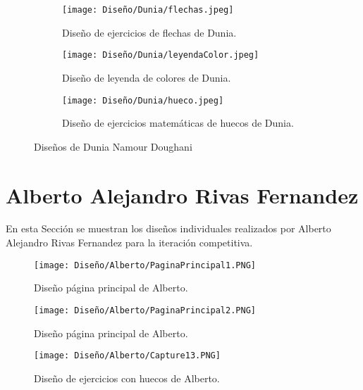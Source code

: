 \begin{figure}[ht!]
  \ContinuedFloat
  \begin{subfigure}{\textwidth}
    \centering
    \texttt{[image: Diseño/Dunia/flechas.jpeg]}
    \caption{Diseño de ejercicios de flechas de Dunia.}
    \label{dunia4}
  \end{subfigure}

  \begin{subfigure}{\textwidth}
    \centering
    \texttt{[image: Diseño/Dunia/leyendaColor.jpeg]}
    \caption{Diseño de leyenda de colores de Dunia.}
    \label{dunia5}
  \end{subfigure}

  \begin{subfigure}{\textwidth}
    \centering
    \texttt{[image: Diseño/Dunia/hueco.jpeg]}
    \caption{Diseño de ejercicios matemáticas de huecos de Dunia.}
    \label{dunia6}
  \end{subfigure}

  \caption{Diseños de Dunia Namour Doughani}
  \label{fig:disenyoDunia}
\end{figure}



\section{Alberto Alejandro Rivas Fernandez}
\label{sec:disenyoAlberto}
En esta Sección se muestran los diseños individuales realizados por Alberto Alejandro Rivas Fernandez para la iteración competitiva.

\begin{figure}[ht!]
  \centering
  \texttt{[image: Diseño/Alberto/PaginaPrincipal1.PNG]}
  \caption{Diseño página principal de Alberto.}
  \label{AlbertoPaginaPrincipal1}
\end{figure}

\begin{figure}[ht!]
  \centering
  \texttt{[image: Diseño/Alberto/PaginaPrincipal2.PNG]}
  \caption{Diseño página principal de Alberto.}
  \label{AlbertoPaginaPrincipal2}
\end{figure}


\begin{figure}[ht!]
  \centering
  \texttt{[image: Diseño/Alberto/Capture13.PNG]}
  \caption{Diseño de ejercicios con huecos de Alberto.}
  \label{Alberto13}
\end{figure}


